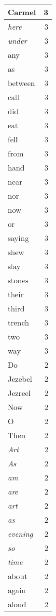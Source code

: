 \begin{center}
\begin{longtable}{l|r}
Carmel & 3 \\ \hline
\emph{here} & 3 \\ \hline
\emph{under} & 3 \\ \hline
any & 3 \\ \hline
as & 3 \\ \hline
between & 3 \\ \hline
call & 3 \\ \hline
did & 3 \\ \hline
eat & 3 \\ \hline
fell & 3 \\ \hline
from & 3 \\ \hline
hand & 3 \\ \hline
near & 3 \\ \hline
nor & 3 \\ \hline
now & 3 \\ \hline
or & 3 \\ \hline
saying & 3 \\ \hline
shew & 3 \\ \hline
slay & 3 \\ \hline
stones & 3 \\ \hline
their & 3 \\ \hline
third & 3 \\ \hline
trench & 3 \\ \hline
two & 3 \\ \hline
way & 3 \\ \hline
Do & 2 \\ \hline
Jezebel & 2 \\ \hline
Jezreel & 2 \\ \hline
Now & 2 \\ \hline
O & 2 \\ \hline
Then & 2 \\ \hline
\emph{Art} & 2 \\ \hline
\emph{As} & 2 \\ \hline
\emph{am} & 2 \\ \hline
\emph{are} & 2 \\ \hline
\emph{art} & 2 \\ \hline
\emph{as} & 2 \\ \hline
\emph{evening} & 2 \\ \hline
\emph{so} & 2 \\ \hline
\emph{time} & 2 \\ \hline
about & 2 \\ \hline
again & 2 \\ \hline
aloud & 2 \\ \hline

\end{longtable}
\end{center}
